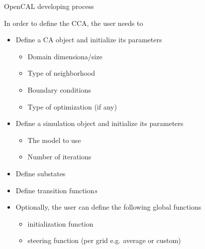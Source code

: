 
\begin{frame}{OpenCAL developing process}

In order to define the CCA, the user needs to

\begin{itemize}
	\item Define a CA object and initialize its parameters
	\begin{itemize}
		\item Domain dimensiona/size
		\item Type of neighborhood
		\item Boundary conditions
		\item Type of optimization (if any)
	\end{itemize}
	\item Define a simulation object and initialize its parameters
	\begin{itemize}
		\item The model to use
		\item Number of iterations
	\end{itemize}
	\item Define substates
	\item Define transition function\textit{s}
	\item Optionally, the user can define the following global functions
	\begin{itemize}
		\item initialization function
		\item steering function (per grid e.g. average or custom)
	\end{itemize}
\end{itemize}

\end{frame}

